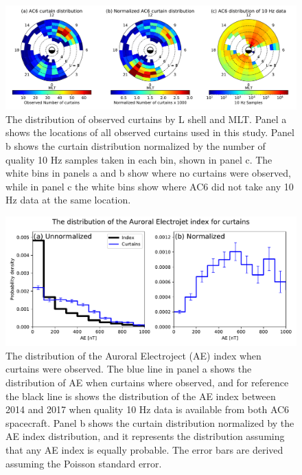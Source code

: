 \documentclass[draft]{agujournal2019}
\begin{document}
\begin{figure}
\includegraphics[width=\textwidth]{fig3_v3.pdf}
\caption{The distribution of observed curtains by L shell and MLT. Panel a shows the locations of all observed curtains used in this study. Panel b shows the curtain distribution normalized by the number of quality 10 Hz samples taken in each bin, shown in panel c. The white bins in panels a and b show where no curtains were observed, while in panel c the white bins show where AC6 did not take any 10 Hz data at the same location.}
\label{l_mlt_dist}
\end{figure}

\begin{figure}
\includegraphics[width=\textwidth]{fig4.pdf}
\caption{The distribution of the Auroral Electroject (AE) index when curtains were observed. The blue line in panel a shows the distribution of AE when curtains where observed, and for reference the black line is shows the distribution of the AE index between 2014 and 2017 when quality 10 Hz data is available from both AC6 spacecraft. Panel b shows the curtain distribution normalized by the AE index distribution, and it represents the distribution assuming that any AE index is equally probable. The error bars are derived assuming the Poisson standard error.}
\label{ae_dist}
\end{figure}
\end{document}

